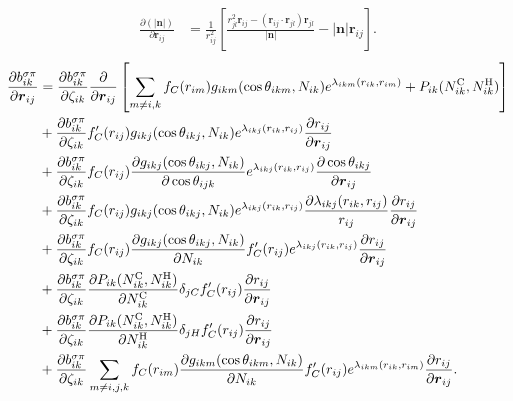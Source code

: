 \documentclass[12pt,a4paper]{report}
\newcommand{\vect}[1]{\boldsymbol{#1}}
\begin{document}
\begin{align} 
\frac{\partial (|\vect{n}|) }{ \partial \vect{r}_{ij}} 
& = 
\frac{1}{r_{ij}^2}
\left[
    \frac{r_{jl}^2 \vect{r}_{ij} - (\vect{r}_{ij} \cdot \vect{r}_{jl}) \vect{r}_{jl} }{|\vect{n}|} - |\vect{n}| \vect{r}_{ij}
\right] .
\end{align}
\begin{align} 
\frac{\partial  b_{ik}^{\sigma\pi}}{\partial \vect{r}_{ij}} 
&= \frac{\partial  b_{ik}^{\sigma\pi}}{\partial \zeta_{ik}}
\frac{\partial }{\partial \vect{r}_{ij}}  \left[ \sum_{m\neq i, k} f_C(r_{im}) g_{ikm}(\cos\theta_{ikm}, N_{ik})e^{\lambda_{ikm}(r_{ik},r_{im})}  + P_{ik}(N_{ik}^{\rm C}, N_{ik}^{\rm H})\right] \nonumber \\
&+\frac{\partial  b_{ik}^{\sigma\pi}}{\partial \zeta_{ik}} f'_C(r_{ij}) g_{ikj}(\cos\theta_{ikj}, N_{ik})e^{\lambda_{ikj}(r_{ik},r_{ij})}  \frac{\partial r_{ij}}{\partial \vect{r}_{ij}}\nonumber \\
&+ \frac{\partial  b_{ik}^{\sigma\pi}}{\partial \zeta_{ik}}f_C(r_{ij}) \frac{\partial g_{ikj}(\cos\theta_{ikj}, N_{ik})}{\partial \cos\theta_{ijk}} e^{\lambda_{ikj}(r_{ik},r_{ij})}  \frac{\partial \cos\theta_{ikj}}{\partial \vect{r}_{ij}}\nonumber \\
&+ \frac{\partial  b_{ik}^{\sigma\pi}}{\partial \zeta_{ik}}f_C(r_{ij}) g_{ikj}(\cos\theta_{ikj}, N_{ik})e^{\lambda_{ikj}(r_{ik},r_{ij})} \frac{\partial \lambda_{ikj}(r_{ik},r_{ij})}{r_{ij}} \frac{\partial r_{ij}}{\partial \vect{r}_{ij}}\nonumber \\
&+ \frac{\partial  b_{ik}^{\sigma\pi}}{\partial \zeta_{ik}}f_C(r_{ij}) \frac{\partial g_{ikj}(\cos\theta_{ikj}, N_{ik})}{\partial N_{ik}}  f'_C(r_{ij}) e^{\lambda_{ikj}(r_{ik},r_{ij})} \frac{\partial r_{ij}}{\partial \vect{r}_{ij}} \nonumber \\
&+ \frac{\partial  b_{ik}^{\sigma\pi}}{\partial \zeta_{ik}} \frac{\partial P_{ik}(N_{ik}^{\rm C}, N_{ik}^{\rm H})}{\partial N_{ik}^{\rm C}} \delta_{jC} f'_C(r_{ij}) \frac{\partial r_{ij}}{\partial \vect{r}_{ij}}\nonumber \\
&+ \frac{\partial  b_{ik}^{\sigma\pi}}{\partial \zeta_{ik}} \frac{\partial P_{ik}(N_{ik}^{\rm C}, N_{ik}^{\rm H})}{\partial N_{ik}^{\rm H}} \delta_{jH} f'_C(r_{ij}) \frac{\partial r_{ij}}{\partial \vect{r}_{ij}}\nonumber \\
&+ \frac{\partial  b_{ik}^{\sigma\pi}}{\partial \zeta_{ik}}\sum_{m\neq i,j,k} f_C(r_{im}) \frac{\partial g_{ikm}(\cos\theta_{ikm}, N_{ik})}{\partial N_{ik}}  f'_C(r_{ij}) e^{\lambda_{ikm}(r_{ik},r_{im})} \frac{\partial r_{ij}}{\partial \vect{r}_{ij}}.
\end{align}
\end{document}

